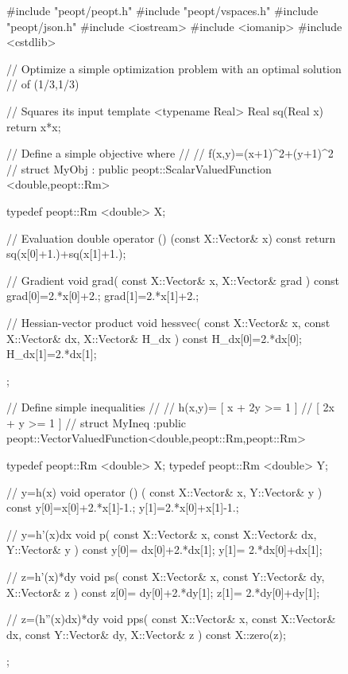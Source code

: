 \begin{figure}
    \begin{lstCpp}
#include "peopt/peopt.h"
#include "peopt/vspaces.h"
#include "peopt/json.h"
#include <iostream>
#include <iomanip>
#include <cstdlib>

// Optimize a simple optimization problem with an optimal solution
// of (1/3,1/3)

// Squares its input
template <typename Real>
Real sq(Real x){
    return x*x;
}

// Define a simple objective where 
// 
// f(x,y)=(x+1)^2+(y+1)^2
//
struct MyObj
    : public peopt::ScalarValuedFunction <double,peopt::Rm>
{
    typedef peopt::Rm <double> X;

    // Evaluation 
    double operator () (const X::Vector& x) const {
        return sq(x[0]+1.)+sq(x[1]+1.);
    }

    // Gradient
    void grad(
        const X::Vector& x,
        X::Vector& grad
    ) const {
        grad[0]=2.*x[0]+2.;
        grad[1]=2.*x[1]+2.;
    }

    // Hessian-vector product
    void hessvec(
        const X::Vector& x,
        const X::Vector& dx,
        X::Vector& H_dx
    ) const {
        H_dx[0]=2.*dx[0];
        H_dx[1]=2.*dx[1];
    }
};
\end{lstCpp}
\end{figure}
\begin{figure}
    \ContinuedFloat
    \begin{lstCpp}
// Define simple inequalities 
//
// h(x,y)= [ x + 2y >= 1 ] 
//         [ 2x + y >= 1 ] 
//
struct MyIneq
    :public peopt::VectorValuedFunction<double,peopt::Rm,peopt::Rm>
{
    typedef peopt::Rm <double> X;
    typedef peopt::Rm <double> Y;

    // y=h(x) 
    void operator () (
        const X::Vector& x,
        Y::Vector& y
    ) const {
        y[0]=x[0]+2.*x[1]-1.;
        y[1]=2.*x[0]+x[1]-1.;
    }
    
    // y=h'(x)dx
    void p(
        const X::Vector& x,
        const X::Vector& dx,
        Y::Vector& y
    ) const { 
        y[0]= dx[0]+2.*dx[1];
        y[1]= 2.*dx[0]+dx[1];
    }
    
    // z=h'(x)*dy
    void ps(
        const X::Vector& x,
        const Y::Vector& dy,
        X::Vector& z
    ) const { 
        z[0]= dy[0]+2.*dy[1];
        z[1]= 2.*dy[0]+dy[1];
    }
    
    // z=(h''(x)dx)*dy
    void pps( 
        const X::Vector& x,
        const X::Vector& dx,
        const Y::Vector& dy,
        X::Vector& z
    ) const {
        X::zero(z);
    }
};
\end{lstCpp}
\end{figure}
